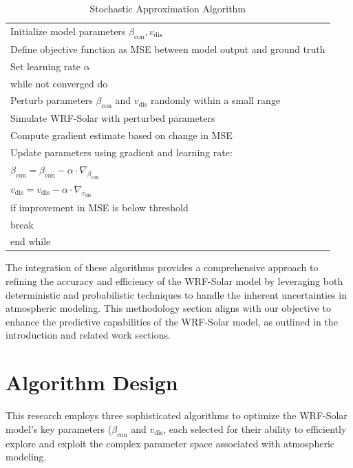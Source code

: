 \documentclass[conference]{IEEEtran}
\begin{document}
\begin{table}[ht]
\centering
\begin{tabular}{l}
Initialize model parameters \(\beta_{\text{con}}, v_{\text{dis}}\)\\
Define objective function as MSE between model output and ground truth\\
Set learning rate \(\alpha\)\\[6pt]
while not converged do\\
\quad Perturb parameters \(\beta_{\text{con}}\) and \(v_{\text{dis}}\) randomly within a small range\\
\quad Simulate WRF-Solar with perturbed parameters\\
\quad Compute gradient estimate based on change in MSE\\
\quad Update parameters using gradient and learning rate:\\
\quad\quad \(\beta_{\text{con}} = \beta_{\text{con}} - \alpha \cdot \nabla_{\beta_{\text{con}}}\)\\
\quad\quad \(v_{\text{dis}} = v_{\text{dis}} - \alpha \cdot \nabla_{v_{\text{dis}}}\)\\
\quad if improvement in MSE is below threshold\\
\quad\quad break\\
end while\\
\end{tabular}
\caption{Stochastic Approximation Algorithm}
\label{alg:grad_opt}
\end{table}


The integration of these algorithms provides a comprehensive approach to refining the accuracy and efficiency of the WRF-Solar model by leveraging both deterministic and probabilistic techniques to handle the inherent uncertainties in atmospheric modeling. This methodology section aligns with our objective to enhance the predictive capabilities of the WRF-Solar model, as outlined in the introduction and related work sections.


\section{Algorithm Design}
This research employs three sophisticated algorithms to optimize the WRF-Solar model’s key parameters (\(\beta_{\text{con}}\) and \(v_{\text{dis}}\), each selected for their ability to efficiently explore and exploit the complex parameter space associated with atmospheric modeling.
\end{document}
